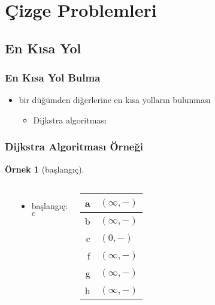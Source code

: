 \documentclass[dvipsnames]{beamer}
\theoremstyle{definition}
\theoremstyle{example}
\newtheorem{ornek}[theorem]{Örnek}
\theoremstyle{plain}
\begin{document}
\section{Çizge Problemleri}

\subsection{En Kısa Yol}

\begin{frame}
  \frametitle{En Kısa Yol Bulma}

  \begin{itemize}
    \item bir düğümden diğerlerine en kısa yolların bulunması
    \begin{itemize}
      \item Dijkstra algoritması
    \end{itemize}
  \end{itemize}
\end{frame}

\begin{frame}
  \frametitle{Dijkstra Algoritması Örneği}

  \begin{ornek}[başlangıç]
    \begin{columns}
      \begin{center}
      \end{center}

      \begin{itemize}
        \item başlangıç: $c$
      \end{itemize}

      \begin{table}
        \begin{tabular}{r|l}
          a & $(\infty,-)$ \\\hline
          b & $(\infty,-)$ \\\hline
          c & $(0,-)$      \\\hline
          f & $(\infty,-)$ \\\hline
          g & $(\infty,-)$ \\\hline
          h & $(\infty,-)$
        \end{tabular}
      \end{table}
    \end{columns}
  \end{ornek}
\end{frame}
\end{document}
